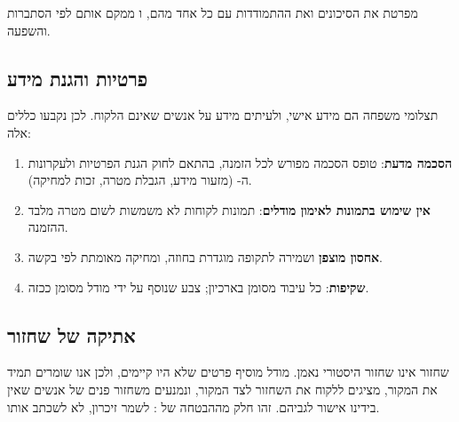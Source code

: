  מפרטת את הסיכונים ואת ההתמודדות עם כל אחד מהם, ו ממקם אותם לפי הסתברות והשפעה.

\subsection{פרטיות והגנת מידע}
תצלומי משפחה הם מידע אישי, ולעיתים מידע על אנשים שאינם הלקוח. לכן נקבעו כללים אלה:
\begin{enumerate}[leftmargin=*]
  \item \textbf{הסכמה מדעת}: טופס הסכמה מפורש לכל הזמנה, בהתאם לחוק הגנת הפרטיות \cite{ilprivacy1981} ולעקרונות ה- \cite{gdpr2016} (מזעור מידע, הגבלת מטרה, זכות למחיקה).
  \item \textbf{אין שימוש בתמונות לאימון מודלים}: תמונות לקוחות לא משמשות לשום מטרה מלבד ההזמנה.
  \item \textbf{אחסון מוצפן} ושמירה לתקופה מוגדרת בחוזה, ומחיקה מאומתת לפי בקשה.
  \item \textbf{שקיפות}: כל עיבוד  מסומן בארכיון; צבע שנוסף על ידי מודל מסומן ככזה.
\end{enumerate}

\subsection{אתיקה של שחזור}
שחזור אינו שחזור היסטורי נאמן. מודל מוסיף פרטים שלא היו קיימים, ולכן אנו שומרים תמיד את המקור, מציגים ללקוח את השחזור לצד המקור, ונמנעים משחזור פנים של אנשים שאין בידינו אישור לגביהם. זהו חלק מההבטחה של : לשמר זיכרון, לא לשכתב אותו.
